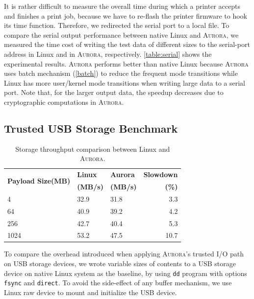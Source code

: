 It is rather difficult to measure the overall time during which a printer accepts and finishes a print job, because we have to re-flash the printer firmware to hook its time function. Therefore, we redirected the serial port to a local file. 
To compare the serial output performance between native Linux and \textsc{Aurora}, we measured the time cost of writing the test data of different sizes to the serial-port address in Linux and in \textsc{Aurora}, respectively. \autoref{table:serial} shows the experimental results. \textsc{Aurora} performs better than native Linux because \textsc{Aurora} uses batch mechanism (\autoref{batch}) to reduce the frequent mode transitions while Linux has more user/kernel mode transitions when writing large data to a serial port. Note that, for the larger output data, the speedup decreases due to cryptographic computations in \textsc{Aurora}.

\subsection{Trusted USB Storage Benchmark}

\begin{table}[t]	
	\centering
	\caption{Storage throughput comparison between Linux and \textsc{Aurora}.}
	\label{table:dd}
	\small
	\begin{tabular}{lllr}
		\toprule
		\multirow{2}{*}{\textbf{Payload Size(MB)}} & \textbf{Linux} & \textbf{Aurora} & \textbf{Slowdown} \\ 
		& \textbf{(MB/s)} & \textbf{(MB/s)} & \textbf{(\%)} \\
		\midrule
		4 & 32.9 & 31.8 & 3.3 \\
		64 & 40.9 & 39.2 & 4.2 \\
		256 & 42.7 & 40.4 & 5.3 \\
		1024 & 53.2 & 47.5 & 10.7 \\
		\bottomrule
	\end{tabular}
\end{table}

To compare the overhead introduced when applying \textsc{Aurora}'s trusted I/O path on USB storage devices, we wrote variable sizes of contents to a USB storage device on native Linux system as the baseline, by using \texttt{dd} program with options \texttt{fsync} and \texttt{direct}. To avoid the side-effect of any buffer mechanism, we use Linux raw device to mount and initialize the USB device. %


